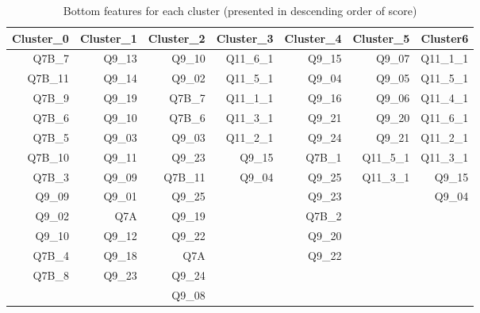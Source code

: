 \documentclass{article}
\begin{document}
\begin{table}[htbp]
  \centering
  \caption{Bottom features for each cluster (presented in descending order of
  score)}
    \begin{tabular}{rrrrrrr}
    \toprule
    Cluster\_0 & Cluster\_1 & Cluster\_2 & Cluster\_3 & Cluster\_4 & Cluster\_5 & Cluster6 \\
    \midrule
    Q7B\_7 & Q9\_13 & Q9\_10 & Q11\_6\_1 & Q9\_15 & Q9\_07 & Q11\_1\_1 \\
    Q7B\_11 & Q9\_14 & Q9\_02 & Q11\_5\_1 & Q9\_04 & Q9\_05 & Q11\_5\_1 \\
    Q7B\_9 & Q9\_19 & Q7B\_7 & Q11\_1\_1 & Q9\_16 & Q9\_06 & Q11\_4\_1 \\
    Q7B\_6 & Q9\_10 & Q7B\_6 & Q11\_3\_1 & Q9\_21 & Q9\_20 & Q11\_6\_1 \\
    Q7B\_5 & Q9\_03 & Q9\_03 & Q11\_2\_1 & Q9\_24 & Q9\_21 & Q11\_2\_1 \\
    Q7B\_10 & Q9\_11 & Q9\_23 & Q9\_15 & Q7B\_1 & Q11\_5\_1 & Q11\_3\_1 \\
    Q7B\_3 & Q9\_09 & Q7B\_11 & Q9\_04 & Q9\_25 & Q11\_3\_1 & Q9\_15 \\
    Q9\_09 & Q9\_01 & Q9\_25 &       & Q9\_23 &       & Q9\_04 \\
    Q9\_02 & Q7A   & Q9\_19 &       & Q7B\_2 &       &  \\
    Q9\_10 & Q9\_12 & Q9\_22 &       & Q9\_20 &       &  \\
    Q7B\_4 & Q9\_18 & Q7A   &       & Q9\_22 &       &  \\
    Q7B\_8 & Q9\_23 & Q9\_24 &       &       &       &  \\
          &       & Q9\_08 &       &       &       &  \\
    \bottomrule
    \end{tabular}
  \label{tab:bottom}
\end{table}
\end{document}
